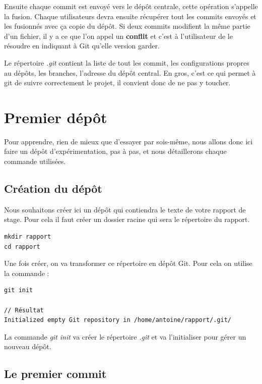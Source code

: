 \documentclass[a4paper]{article}
\begin{document}
Ensuite chaque commit est envoyé vers le dépôt centrale, cette opération s'appelle la fusion. Chaque utilisateurs devra ensuite récupérer tout les commits envoyés et les fusionnés avec ça copie du dépôt. Si deux commits modifient la même partie d'un fichier, il y a ce que l'on appel un \textbf{conflit} et c'est à l'utilisateur de le résoudre en indiquant à Git qu'elle version garder.

Le répertoire \emph{.git} contient la liste de tout les commit, les configurations propres au dépôts, les branches, l'adresse du dépôt central. En gros, c'est ce qui permet à git de suivre correctement le projet, il convient donc de ne pas y toucher.


\section{Premier dép\^ot}

Pour apprendre, rien de mieux que d'essayer par sois-même, nous allons donc ici faire un dépôt d'expérimentation, pas à pas, et nous détaillerons chaque commande utilisées.

\subsection{Création du dép\^ot}

Nous souhaitons créer ici un dépôt qui contiendra le texte de votre rapport de stage. Pour cela il faut créer un dossier racine qui sera le répertoire du rapport.

\begin{verbatim}
mkdir rapport
cd rapport
\end{verbatim}

Une fois créer, on va transformer ce répertoire en dépôt Git. Pour cela on utilise la commande :

\begin{verbatim}
git init

// Résultat
Initialized empty Git repository in /home/antoine/rapport/.git/
\end{verbatim}

La commande \emph{git init} va créer le répertoire \emph{.git} et va l'initialiser pour gérer un nouveau dépôt.

\subsection{Le premier commit}
\end{document}
